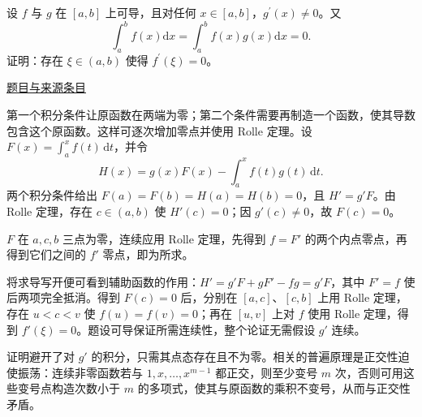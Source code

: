 \documentclass[12pt,fontset=fandol]{ctexart}
\begin{document}
\begin{example}[来源序号5]\label{ex:ch06-14th-A-makeup2:5}\label{pr:ch06-14th-A-makeup2:5}

设 $f$ 与 $g$ 在 $[a,b]$ 上可导，且对任何 $x\in[a,b]$，$g^{\prime}(x)\neq 0$。又
\[
\int_{a}^{b}f(x)\mathrm{d}x=\int_{a}^{b}f(x)g(x)\mathrm{d}x=0.
\]
证明：存在 $\xi\in(a,b)$ 使得 $f^{\prime}(\xi)=0$。

\par\href{https://github.com/lzxcr/cmc-mathematics/blob/64916fa1fdbc3e444a652eca204d5669058ee321/src/problems/preliminary/14-makeup2/05.md}{题目与来源条目}

\end{example}

\begin{solve}\label{ans:ch06-14th-A-makeup2:5}

第一个积分条件让原函数在两端为零；第二个条件需要再制造一个函数，使其导数包含这个原函数。这样可逐次增加零点并使用 Rolle 定理。设 $F(x)=\int_a^x f(t)\,\mathrm dt$，并令
\[
H(x)=g(x)F(x)-\int_a^x f(t)g(t)\,\mathrm dt.
\]
两个积分条件给出 $F(a)=F(b)=H(a)=H(b)=0$，且 $H'=g'F$。由 Rolle 定理，存在 $c\in(a,b)$ 使 $H'(c)=0$；因 $g'(c)\neq0$，故 $F(c)=0$。

$F$ 在 $a,c,b$ 三点为零，连续应用 Rolle 定理，先得到 $f=F'$ 的两个内点零点，再得到它们之间的 $f'$ 零点，即为所求。

将求导写开便可看到辅助函数的作用：$H'=g'F+gF'-fg=g'F$，其中 $F'=f$ 使后两项完全抵消。得到 $F(c)=0$ 后，分别在 $[a,c]$、$[c,b]$ 上用 Rolle 定理，存在 $u<c<v$ 使 $f(u)=f(v)=0$；再在 $[u,v]$ 上对 $f$ 使用 Rolle 定理，得到 $f'(\xi)=0$。题设可导保证所需连续性，整个论证无需假设 $g'$ 连续。

\end{solve}

\begin{remark}[方法与条件]证明避开了对 $g'$ 的积分，只需其点态存在且不为零。相关的普遍原理是正交性迫使振荡：连续非零函数若与 $1,x,\ldots,x^{m-1}$ 都正交，则至少变号 $m$ 次，否则可用这些变号点构造次数小于 $m$ 的多项式，使其与原函数的乘积不变号，从而与正交性矛盾。\end{remark}
\end{document}
